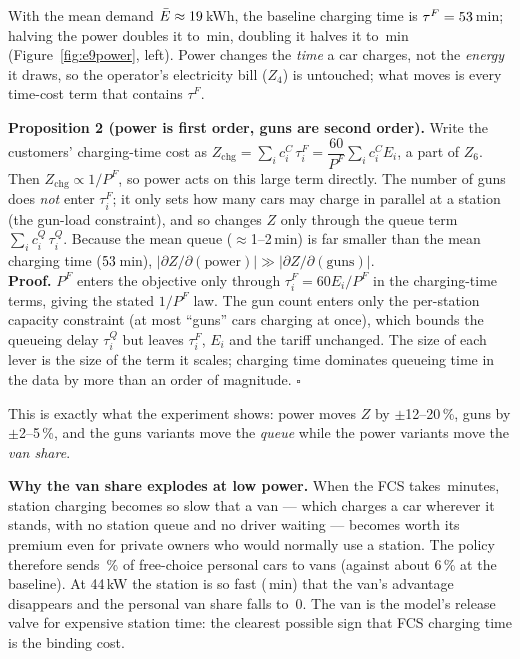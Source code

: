 With the mean demand $\bar E \approx 19$\,kWh, the baseline charging time is $\tau^F=53$\,min; halving the power doubles it to \feNineTauHalf\,min, doubling it halves it to \feNineTauDbl\,min (Figure~\ref{fig:e9power}, left). Power changes the \emph{time} a car charges, not the \emph{energy} it draws, so the operator's electricity bill ($Z_4$) is untouched; what moves is every time-cost term that contains $\tau^F$.

\begin{keybox}
\textbf{Proposition 2 (power is first order, guns are second order).} Write the customers' charging-time cost as $Z_{\text{chg}}=\sum_i c^C_i\,\tau^F_i=\dfrac{60}{P^F}\sum_i c^C_i E_i$, a part of $Z_6$. Then $Z_{\text{chg}}\propto 1/P^F$, so power acts on this large term directly. The number of guns does \emph{not} enter $\tau^F_i$; it only sets how many cars may charge in parallel at a station (the gun-load constraint), and so changes $Z$ only through the queue term $\sum_i c^Q_i\,\tau^Q_i$. Because the mean queue ($\approx$1--2\,min) is far smaller than the mean charging time ($53$\,min), $\bigl|\partial Z/\partial(\text{power})\bigr|\gg\bigl|\partial Z/\partial(\text{guns})\bigr|$.\\[2pt]
\textbf{Proof.} $P^F$ enters the objective only through $\tau^F_i=60E_i/P^F$ in the charging-time terms, giving the stated $1/P^F$ law. The gun count enters only the per-station capacity constraint (at most ``guns'' cars charging at once), which bounds the queueing delay $\tau^Q_i$ but leaves $\tau^F_i$, $E_i$ and the tariff unchanged. The size of each lever is the size of the term it scales; charging time dominates queueing time in the data by more than an order of magnitude. $\square$
\end{keybox}

This is exactly what the experiment shows: power moves $Z$ by $\pm$12--20\,\%, guns by $\pm$2--5\,\%, and the guns variants move the \emph{queue} while the power variants move the \emph{van share}.

\textbf{Why the van share explodes at low power.} When the FCS takes \feNineTauHalf\,minutes, station charging becomes so slow that a van --- which charges a car wherever it stands, with no station queue and no driver waiting --- becomes worth its premium even for private owners who would normally use a station. The policy therefore sends \feNinePowHalfVan\,\% of free-choice personal cars to vans (against about 6\,\% at the baseline). At 44\,kW the station is so fast (\feNineTauDbl\,min) that the van's advantage disappears and the personal van share falls to~0. The van is the model's release valve for expensive station time: the clearest possible sign that FCS charging time is the binding cost.

